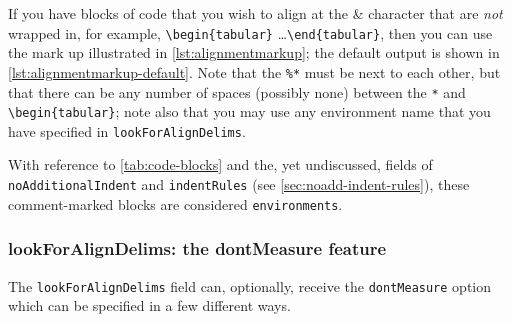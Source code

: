  If you have blocks of code that you wish to align at the \& character that are \emph{not}
 wrapped in, for example, \lstinline!\begin{tabular}! \ldots \lstinline!\end{tabular}!,
 then you can use the mark up illustrated in \cref{lst:alignmentmarkup}; the default
 output is shown in \cref{lst:alignmentmarkup-default}. Note that the \lstinline!%*! must
 be next to each other, but that there can be any number of spaces (possibly none) between
 the \lstinline!*! and \lstinline!\begin{tabular}!; note also that you may use any
 environment name that you have specified in \texttt{lookForAlignDelims}.

 \begin{cmhtcbraster}[raster left skip=-1.5cm,]
 \end{cmhtcbraster}

 With reference to \vref{tab:code-blocks} and the, yet undiscussed, fields of
 \texttt{noAdditionalIndent} and \texttt{indentRules} (see \vref{sec:noadd-indent-rules}),
 these comment-marked blocks are considered \texttt{environments}.

\subsubsection{lookForAlignDelims: the dontMeasure feature}\label{sec:dontMeasure}
 The  \texttt{lookForAlignDelims} field can,
 optionally, receive the \texttt{dontMeasure} option which can be specified in a few
 different ways.

